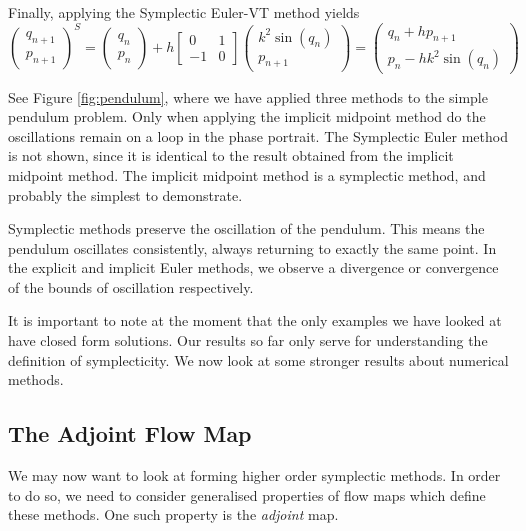 \documentclass{report}
\theoremstyle{exampstyle} \newtheorem{example}[theorem]{Example}
\theoremstyle{exampstyle} \newtheorem{remark}[theorem]{Remark}
\theoremstyle{exampstyle} \newtheorem{definition}[theorem]{Definition}
\theoremstyle{exampstyle} \newtheorem{lemma}[theorem]{Lemma}
\theoremstyle{exampstyle} \newtheorem{proposition}[theorem]{Proposition}
\begin{document}
Finally, applying the Symplectic Euler-VT method yields
\begin{equation}
	\begin{pmatrix}
		q_{n+1} \\
		p_{n+1}
	\end{pmatrix}^S = \begin{pmatrix}
		q_n \\
		p_n
	\end{pmatrix} + h \begin{bmatrix}
		0 & 1 \\
		-1 & 0
	\end{bmatrix} \begin{pmatrix}
		k^2 \sin(q_n) \\
		p_{n+1}
	\end{pmatrix} = \begin{pmatrix}
		q_n + h p_{n+1} \\
		p_n - h k^2 \sin(q_n)
	\end{pmatrix}
\end{equation}

See Figure \ref{fig:pendulum}, where we have applied three methods to the simple pendulum problem.
Only when applying the implicit midpoint method do the oscillations remain on a loop in the phase portrait.
The Symplectic Euler method is not shown, since it is identical to the result obtained from the implicit midpoint method.
The implicit midpoint method is a symplectic method, and probably the simplest to demonstrate.

Symplectic methods preserve the oscillation of the pendulum.
This means the pendulum oscillates consistently, always returning to exactly the same point.
In the explicit and implicit Euler methods, we observe a divergence or convergence of the bounds of oscillation respectively.

It is important to note at the moment that the only examples we have looked at have closed form solutions.
Our results so far only serve for understanding the definition of symplecticity.
We now look at some stronger results about numerical methods.

\subsection{The Adjoint Flow Map}

We may now want to look at forming higher order symplectic methods. In order to do so, we need to consider generalised properties of flow maps which define these methods.
One such property is the \textit{adjoint} map.
\end{document}
